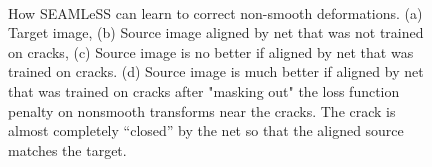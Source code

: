 \documentclass{article}
\begin{document}
\begin{figure}[htp]
	\centering
	 \\
	\caption{How SEAMLeSS can learn to correct non-smooth deformations. (a) Target image, (b) Source image aligned by net that was not trained on cracks, (c) Source image is no better if aligned by net that was trained on cracks. (d) Source image is much better if aligned by net that was trained on cracks after "masking out" the loss function penalty on nonsmooth transforms near the cracks. The crack is almost completely ``closed'' by the net so that the aligned source matches the target.}\label{crackmaskcompare}
\end{figure}
\end{document}

